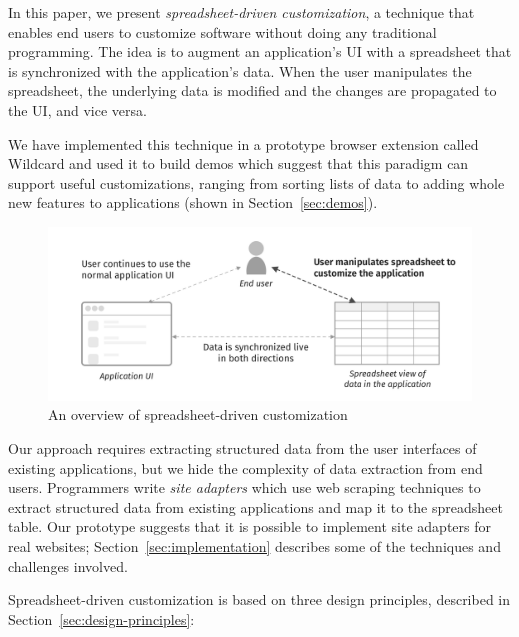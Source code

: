 \documentclass[english]{programming}
\begin{document}
In this paper, we present \emph{spreadsheet-driven customization}, a
technique that enables end users to customize software without doing any
traditional programming. The idea is to augment an application's UI with
a spreadsheet that is synchronized with the application's data. When the
user manipulates the spreadsheet, the underlying data is modified and
the changes are propagated to the UI, and vice versa.

We have implemented this technique in a prototype browser extension
called Wildcard and used it to build demos which suggest that this
paradigm can support useful customizations, ranging from sorting lists
of data to adding whole new features to applications (shown in
Section~\ref{sec:demos}).

\begin{figure}
\hypertarget{fig:overview}{%
\centering
\includegraphics{media/overview-300dpi.png}
\caption{An overview of spreadsheet-driven
customization}\label{fig:overview}
}
\end{figure}

Our approach requires extracting structured data from the user
interfaces of existing applications, but we hide the complexity of data
extraction from end users. Programmers write \emph{site adapters} which
use web scraping techniques to extract structured data from existing
applications and map it to the spreadsheet table. Our prototype suggests
that it is possible to implement site adapters for real websites;
Section~\ref{sec:implementation} describes some of the techniques and
challenges involved.

Spreadsheet-driven customization is based on three design principles,
described in Section~\ref{sec:design-principles}:
\end{document}
